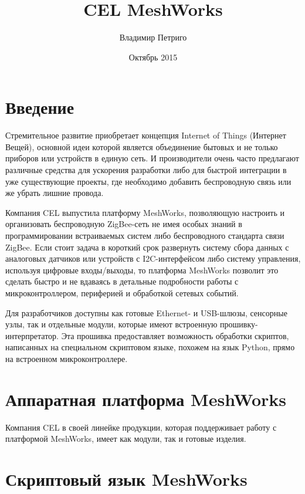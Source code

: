 \documentclass[12pt]{article}
\title{CEL MeshWorks}
\author{Владимир Петриго}
\date{Октябрь 2015}
\begin{document}
\maketitle

\section{Введение}

Стремительное развитие приобретает концепция Internet of Things (Интернет Вещей),
основной идеи которой является объединение бытовых и не только приборов или 
устройств в единую сеть. И производители очень часто предлагают различные 
средства для ускорения разработки либо для быстрой интеграции в уже существующие 
проекты, где необходимо добавить беспроводную связь или же убрать лишние провода.

Компания CEL выпустила платформу MeshWorks, позволяющую настроить и организовать 
беспроводную ZigBee-сеть не имея особых знаний в программировании встраиваемых систем
либо беспроводного стандарта связи ZigBee. Если стоит задача в короткий срок развернуть
систему сбора данных с аналоговых датчиков или устройств с I2C-интерфейсом либо 
систему управления, используя цифровые входы/выходы, то платформа MeshWorks позволит
это сделать быстро и не вдаваясь в детальные подробности работы с микроконтроллером, 
периферией и обработкой сетевых событий.

Для разработчиков доступны как готовые Ethernet- и USB-шлюзы, сенсорные узлы, так и
отдельные модули, которые имеют встроенную прошивку-интерпретатор. Эта прошивка
предоставляет возможность обработки скриптов, написанных на специальном скриптовом языке,
похожем на язык Python, прямо на встроенном микроконтроллере. 
\section{Аппаратная платформа MeshWorks}
Компания CEL в своей линейке продукции, которая поддерживает работу с платформой 
MeshWorks, имеет как модули, так и готовые изделия.


\section{Скриптовый язык MeshWorks}
\end{document}
